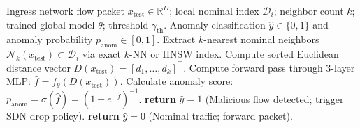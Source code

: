 \begin{algorithm}[t]
\caption{Fed-LUNAR Edge Streaming Inference Engine}
\label{alg:fed_lunar_inference}
\begin{algorithmic}[1]
\REQUIRE Ingress network flow packet $x_{\text{test}} \in \mathbb{R}^D$; local nominal index $\mathcal{D}_i$; neighbor count $k$; trained global model $\theta$; threshold $\gamma_{\text{th}}$.
\ENSURE Anomaly classification $\hat{y} \in \{0, 1\}$ and anomaly probability $p_{\text{anom}} \in [0, 1]$.
\STATE Extract $k$-nearest nominal neighbors $\mathcal{N}_k(x_{\text{test}}) \subset \mathcal{D}_i$ via exact $k$-NN or HNSW index.
\STATE Compute sorted Euclidean distance vector $D(x_{\text{test}}) = [d_1, \dots, d_k]^\top$.
\STATE Compute forward pass through 3-layer MLP: $\hat{f} = f_\theta(D(x_{\text{test}}))$.
\STATE Calculate anomaly score: $p_{\text{anom}} = \sigma(\hat{f}) = (1 + e^{-\hat{f}})^{-1}$.
    \STATE \textbf{return} $\hat{y} = 1$ (Malicious flow detected; trigger SDN drop policy).
\ELSE
    \STATE \textbf{return} $\hat{y} = 0$ (Nominal traffic; forward packet).
\ENDIF
\end{algorithmic}
\end{algorithm}
